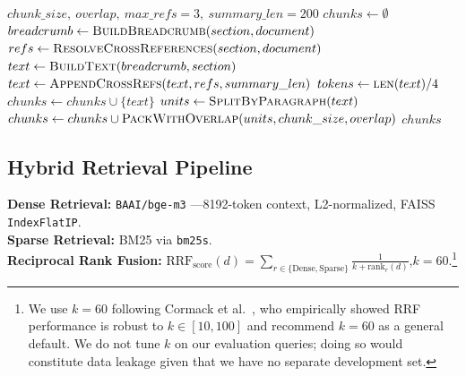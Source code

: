 \documentclass[sn-mathphys,Numbered]{sn-jnl}%
\begin{document}
\begin{algorithm}
\caption{StrucChunk}
\label{alg:strucchunk}
\begin{algorithmic}[1]
\Require $chunk\_size,\ overlap,\ max\_refs = 3,\ summary\_len = 200$
    \State $chunks \gets \emptyset$
        \State $breadcrumb \gets \Call{BuildBreadcrumb}{section, document}$
        \State $refs \gets \Call{ResolveCrossReferences}{section, document}$
        \State $text \gets \Call{BuildText}{breadcrumb, section}$
            \State $text \gets \Call{AppendCrossRefs}{text, refs, summary\_len}$
        \EndIf
        \State $tokens \gets \Call{len}{text} / 4$ 
            \State $chunks \gets chunks \cup \{text\}$
        \Else
            \State $units \gets \Call{SplitByParagraph}{text}$
            \State $chunks \gets chunks \cup \Call{PackWithOverlap}{units, chunk\_size, overlap}$
        \EndIf
    \EndFor
    \State \Return $chunks$
\EndFunction
\end{algorithmic}
\end{algorithm}


\subsection{Hybrid Retrieval Pipeline}

\textbf{Dense Retrieval:} \texttt{BAAI/bge-m3} \cite{chen-etal-2024-m3}---8192-token context, L2-normalized, FAISS \texttt{IndexFlatIP}.\\
\textbf{Sparse Retrieval:} BM25 via \texttt{bm25s}.\\
\textbf{Reciprocal Rank Fusion:}
$\mathrm{RRF}_{\mathrm{score}}(d) = \sum_{r \in \{\mathrm{Dense},\mathrm{Sparse}\}} \frac{1}{k + \mathrm{rank}_r(d)}$,\quad $k=60$.\footnote{We use $k=60$ following Cormack et al.~\cite{Cormack2009ReciprocalRF}, who empirically showed RRF performance is robust to $k \in [10, 100]$ and recommend $k=60$ as a general default.  We do not tune $k$ on our evaluation queries; doing so would constitute data leakage given that we have no separate development set.}
\end{document}
